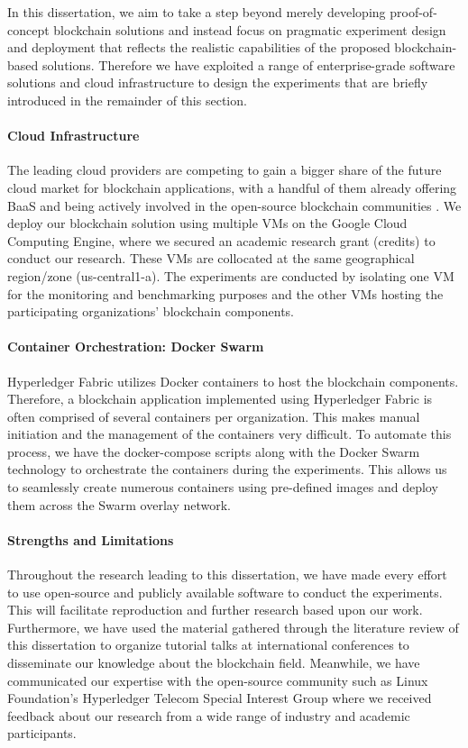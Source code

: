 In this dissertation, we aim to take a step beyond merely developing proof-of-concept blockchain solutions and instead focus on pragmatic experiment design and deployment that reflects the realistic capabilities of the proposed blockchain-based solutions. Therefore we have exploited a range of enterprise-grade software solutions and cloud infrastructure to design the experiments that are briefly introduced in the remainder of this section.

\paragraph{Cloud Infrastructure}


The leading cloud providers are competing to gain a bigger share of the future cloud market for blockchain applications, with a handful of them already offering \ac{BaaS} and being actively involved in the open-source blockchain communities \cite{bc_cloud}. We deploy our blockchain solution using multiple \acp{VM} on the Google Cloud Computing Engine, where we secured an academic research grant (credits) to conduct our research. These \acp{VM} are collocated at the same geographical region/zone (us-central1-a). The experiments are conducted by isolating one \ac{VM} for the monitoring and benchmarking purposes and the other \acp{VM} hosting the participating organizations' blockchain components. 
\paragraph{Container Orchestration: Docker Swarm}


Hyperledger Fabric utilizes Docker containers to host the blockchain components. Therefore, a blockchain application implemented using Hyperledger Fabric is often comprised of several containers per organization. This makes manual initiation and the management of the containers very difficult. To automate this process, we have the docker-compose scripts along with the Docker Swarm technology to orchestrate the containers during the experiments. This allows us to seamlessly create numerous containers using pre-defined images and deploy them across the Swarm overlay network.



\paragraph{Strengths and Limitations}

Throughout the research leading to this dissertation, we have made every effort to use open-source and publicly available software to conduct the experiments. This will facilitate reproduction and further research based upon our work. Furthermore, we have used the material gathered through the literature review of this dissertation to organize tutorial talks at international conferences to disseminate our knowledge about the blockchain field. Meanwhile, we have communicated our expertise with the open-source community such as Linux Foundation's Hyperledger Telecom Special Interest Group \cite{telecom_sig} where we received feedback about our research from a wide range of industry and academic participants.

